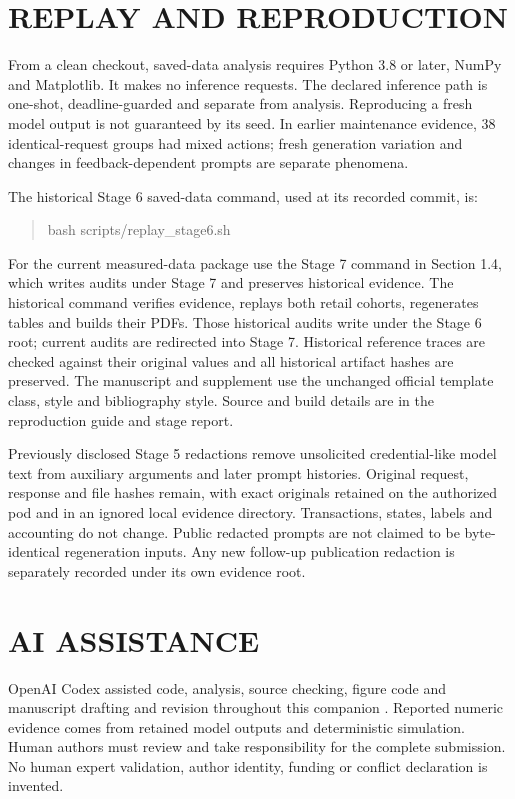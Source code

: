 

\section{REPLAY AND REPRODUCTION}
\noindent From a clean checkout, saved-data analysis requires Python 3.8 or later, NumPy and Matplotlib. It makes no inference requests. The declared inference path is one-shot, deadline-guarded and separate from analysis. Reproducing a fresh model output is not guaranteed by its seed. In earlier maintenance evidence, 38 identical-request groups had mixed actions; fresh generation variation and changes in feedback-dependent prompts are separate phenomena.\draftcredit

The historical Stage 6 saved-data command, used at its recorded commit, is:
\begin{quote}\small\ttfamily
bash scripts/replay\_stage6.sh
\end{quote}
For the current measured-data package use the Stage 7 command in Section 1.4, which writes audits under Stage 7 and preserves historical evidence. The historical command verifies evidence, replays both retail cohorts, regenerates tables and builds their PDFs.
Those historical audits write under the Stage 6 root; current audits are redirected into Stage 7. Historical reference traces are checked against their original values and all historical artifact hashes are preserved. The manuscript and supplement use the unchanged official template class, style and bibliography style. Source and build details are in the reproduction guide and stage report.

Previously disclosed Stage 5 redactions remove unsolicited credential-like model text from auxiliary arguments and later prompt histories. Original request, response and file hashes remain, with exact originals retained on the authorized pod and in an ignored local evidence directory. Transactions, states, labels and accounting do not change. Public redacted prompts are not claimed to be byte-identical regeneration inputs. Any new follow-up publication redaction is separately recorded under its own evidence root.

\section*{AI ASSISTANCE}
OpenAI Codex assisted code, analysis, source checking, figure code and manuscript drafting and revision throughout this companion \cite{openai2026codex}. Reported numeric evidence comes from retained model outputs and deterministic simulation. Human authors must review and take responsibility for the complete submission. No human expert validation, author identity, funding or conflict declaration is invented.


{\small}

